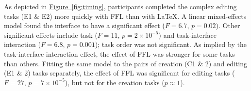 As depicted in \hyperref[fig:timing]{Figure~\ref{fig:timing}}, participants completed the complex editing tasks (E1 \& E2) more quickly with FFL than with LaTeX. A linear mixed-effects model found the interface to have a significant effect ($F=6.7$, $p=0.02$). Other significant effects include task ($F=11$, $p=2\times10^{-5}$) and task-interface interaction ($F=6.8$, $p=0.001$); task order was not significant. As implied by the task-interface interaction effect, the effect of FFL was stronger for some tasks than others. Fitting the same model to the pairs of creation (C1 \& 2) and editing (E1 \& 2) tasks separately, the effect of FFL was significant for editing tasks ($F = 27$, $p=7\times10^{-5}$), but not for the creation tasks ($p\approx1$). 


